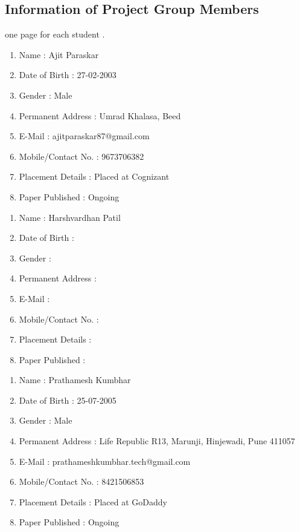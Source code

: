\documentclass[oneside,a4paper,12pt]{report}
\begin{document}
\begin{appendices}
\chapter{Information of Project Group Members}
one page for each student .
\newpage
\begin{enumerate}
\item Name : Ajit Paraskar \hspace{60 mm}\fbox{\parbox[c][75pt][c]{60pt}{\centering\scriptsize [Photo]}}
\item Date of Birth : 27-02-2003
\item Gender : Male
\item Permanent Address : Umrad Khalasa, Beed
\item E-Mail : ajitparaskar87@gmail.com
\item Mobile/Contact No. : 9673706382
\item Placement Details : Placed at Cognizant
\item Paper Published : Ongoing

\end{enumerate}
\newpage
\begin{enumerate}
\item Name : Harshvardhan Patil \hspace{52 mm}\fbox{\parbox[c][75pt][c]{60pt}{\centering\scriptsize [Photo]}}
\item Date of Birth :
\item Gender :
\item Permanent Address :
\item E-Mail :
\item Mobile/Contact No. :
\item Placement Details :
\item Paper Published :

\end{enumerate}
\newpage
\begin{enumerate}
\item Name : Prathamesh Kumbhar \hspace{46 mm}\fbox{\parbox[c][75pt][c]{60pt}{\centering\scriptsize [Photo]}}
\item Date of Birth : 25-07-2005
\item Gender : Male
\item Permanent Address : Life Republic R13, Marunji, Hinjewadi, Pune 411057
\item E-Mail : prathameshkumbhar.tech@gmail.com
\item Mobile/Contact No. : 8421506853
\item Placement Details : Placed at GoDaddy
\item Paper Published : Ongoing


\end{enumerate}
\end{appendices}
\end{document}
